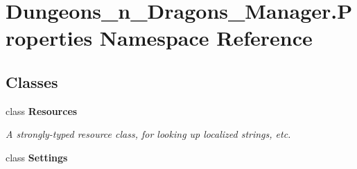 \hypertarget{namespace_dungeons__n___dragons___manager_1_1_properties}{}\section{Dungeons\+\_\+n\+\_\+\+Dragons\+\_\+\+Manager.\+Properties Namespace Reference}
\label{namespace_dungeons__n___dragons___manager_1_1_properties}
\subsection*{Classes}
\begin{DoxyCompactItemize}
\item 
class {\bfseries Resources}
\begin{DoxyCompactList}\small\item\em A strongly-\/typed resource class, for looking up localized strings, etc. \end{DoxyCompactList}\item 
class {\bfseries Settings}
\end{DoxyCompactItemize}
